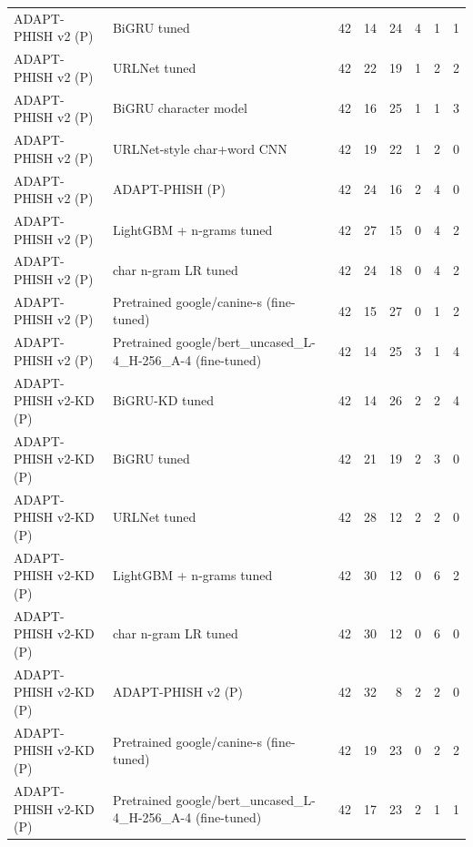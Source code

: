 \begin{table}[t]
\begin{tabular}{llrrrrrr}
ADAPT-PHISH v2 (P) & BiGRU tuned & 42 & 14 & 24 & 4 & 1 & 1 \\
ADAPT-PHISH v2 (P) & URLNet tuned & 42 & 22 & 19 & 1 & 2 & 2 \\
ADAPT-PHISH v2 (P) & BiGRU character model & 42 & 16 & 25 & 1 & 1 & 3 \\
ADAPT-PHISH v2 (P) & URLNet-style char+word CNN & 42 & 19 & 22 & 1 & 2 & 0 \\
ADAPT-PHISH v2 (P) & ADAPT-PHISH (P) & 42 & 24 & 16 & 2 & 4 & 0 \\
ADAPT-PHISH v2 (P) & LightGBM + n-grams tuned & 42 & 27 & 15 & 0 & 4 & 2 \\
ADAPT-PHISH v2 (P) & char n-gram LR tuned & 42 & 24 & 18 & 0 & 4 & 2 \\
ADAPT-PHISH v2 (P) & Pretrained google/canine-s (fine-tuned) & 42 & 15 & 27 & 0 & 1 & 2 \\
ADAPT-PHISH v2 (P) & Pretrained google/bert\_uncased\_L-4\_H-256\_A-4 (fine-tuned) & 42 & 14 & 25 & 3 & 1 & 4 \\
ADAPT-PHISH v2-KD (P) & BiGRU-KD tuned & 42 & 14 & 26 & 2 & 2 & 4 \\
ADAPT-PHISH v2-KD (P) & BiGRU tuned & 42 & 21 & 19 & 2 & 3 & 0 \\
ADAPT-PHISH v2-KD (P) & URLNet tuned & 42 & 28 & 12 & 2 & 2 & 0 \\
ADAPT-PHISH v2-KD (P) & LightGBM + n-grams tuned & 42 & 30 & 12 & 0 & 6 & 2 \\
ADAPT-PHISH v2-KD (P) & char n-gram LR tuned & 42 & 30 & 12 & 0 & 6 & 0 \\
ADAPT-PHISH v2-KD (P) & ADAPT-PHISH v2 (P) & 42 & 32 & 8 & 2 & 2 & 0 \\
ADAPT-PHISH v2-KD (P) & Pretrained google/canine-s (fine-tuned) & 42 & 19 & 23 & 0 & 2 & 2 \\
ADAPT-PHISH v2-KD (P) & Pretrained google/bert\_uncased\_L-4\_H-256\_A-4 (fine-tuned) & 42 & 17 & 23 & 2 & 1 & 1 \\
\bottomrule
\end{tabular}
\end{table}